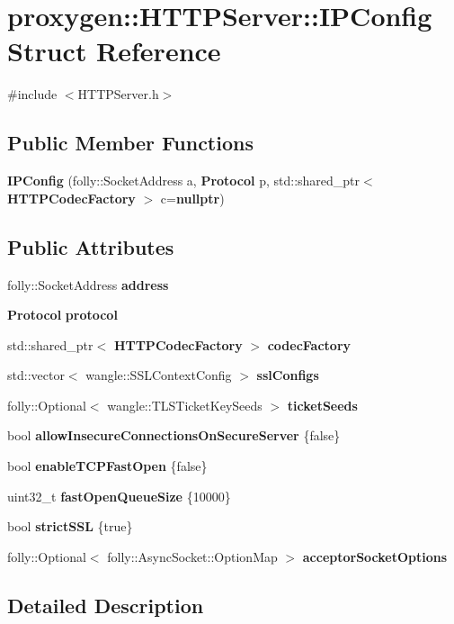 \section{proxygen\+:\+:H\+T\+T\+P\+Server\+:\+:I\+P\+Config Struct Reference}
\label{structproxygen_1_1HTTPServer_1_1IPConfig}


{\ttfamily \#include $<$H\+T\+T\+P\+Server.\+h$>$}

\subsection*{Public Member Functions}
\begin{DoxyCompactItemize}
\item 
{\bf I\+P\+Config} (folly\+::\+Socket\+Address a, {\bf Protocol} p, std\+::shared\+\_\+ptr$<$ {\bf H\+T\+T\+P\+Codec\+Factory} $>$ c={\bf nullptr})
\end{DoxyCompactItemize}
\subsection*{Public Attributes}
\begin{DoxyCompactItemize}
\item 
folly\+::\+Socket\+Address {\bf address}
\item 
{\bf Protocol} {\bf protocol}
\item 
std\+::shared\+\_\+ptr$<$ {\bf H\+T\+T\+P\+Codec\+Factory} $>$ {\bf codec\+Factory}
\item 
std\+::vector$<$ wangle\+::\+S\+S\+L\+Context\+Config $>$ {\bf ssl\+Configs}
\item 
folly\+::\+Optional$<$ wangle\+::\+T\+L\+S\+Ticket\+Key\+Seeds $>$ {\bf ticket\+Seeds}
\item 
bool {\bf allow\+Insecure\+Connections\+On\+Secure\+Server} \{false\}
\item 
bool {\bf enable\+T\+C\+P\+Fast\+Open} \{false\}
\item 
uint32\+\_\+t {\bf fast\+Open\+Queue\+Size} \{10000\}
\item 
bool {\bf strict\+S\+SL} \{true\}
\item 
folly\+::\+Optional$<$ folly\+::\+Async\+Socket\+::\+Option\+Map $>$ {\bf acceptor\+Socket\+Options}
\end{DoxyCompactItemize}


\subsection{Detailed Description}


